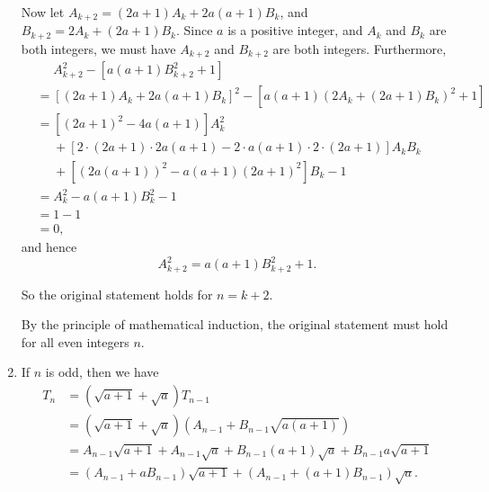 \begin{enumerate}
          Now let \(A_{k + 2} = (2a + 1) A_k + 2a (a + 1) B_k\), and \(B_{k + 2} = 2 A_k + (2a + 1)B_k\). Since \(a\) is a positive integer, and \(A_k\) and \(B_k\) are both integers, we must have \(A_{k + 2}\) and \(B_{k + 2}\) are both integers. Furthermore,
          \begin{align*}
               & \phantom{=} A_{k + 2}^2 - \left[a (a + 1) B_{k + 2}^2 + 1\right]                                                \\
               & = \left[(2a + 1) A_k + 2a (a + 1) B_k\right]^2 - \left[a (a + 1) \left(2 A_k + (2a + 1)B_k\right)^2 + 1\right]  \\
               & = \left[(2a + 1)^2 - 4 a (a + 1)\right] A_k^2                                                                   \\
               & \phantom{=} + \left[2 \cdot (2a + 1) \cdot 2a (a + 1) - 2 \cdot a (a + 1) \cdot 2 \cdot (2a + 1)\right] A_k B_k \\
               & \phantom{=} + [(2a (a + 1))^2 - a (a + 1) (2a + 1)^2] B_k - 1                                                   \\
               & = A_k^2 - a (a + 1) B_k^2 - 1                                                                                   \\
               & = 1 - 1                                                                                                         \\
               & = 0,
          \end{align*}
          and hence
          \[
              A_{k + 2}^2 = a (a + 1) B_{k + 2}^2 + 1.
          \]

          So the original statement holds for \(n = k + 2\).

          By the principle of mathematical induction, the original statement must hold for all even integers \(n\).

    \item If \(n\) is odd, then we have
          \begin{align*}
              T_n & = (\sqrt{a + 1} + \sqrt{a}) T_{n - 1}                                                                 \\
                  & = (\sqrt{a + 1} + \sqrt{a}) (A_{n - 1} + B_{n - 1} \sqrt{a(a + 1)})                                   \\
                  & = A_{n - 1} \sqrt{a + 1} + A_{n - 1} \sqrt{a} + B_{n - 1} (a + 1) \sqrt{a} + B_{n - 1} a \sqrt{a + 1} \\
                  & = (A_{n - 1} + a B_{n - 1}) \sqrt{a + 1} + (A_{n - 1} + (a + 1) B_{n - 1})\sqrt{a}.
          \end{align*}


\end{enumerate}
